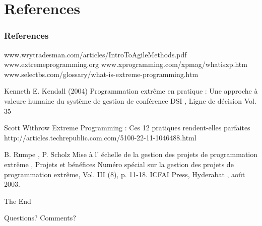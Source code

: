 \documentclass[	11pt, ]{beamer}
\begin{document}
\section{References}
\begin{frame} %
	\frametitle{References}
	
	\begin{thebibliography}{99} %
		\footnotesize %
		
		 www.wrytradesman.com/articles/IntroToAgileMethods.pdf
		www.extremeprogramming.org
		www.xprogramming.com/xpmag/whatisxp.htm
		www.selectbs.com/glossary/what-is-extreme-programming.htm
		
		
			 Kenneth E. Kendall (2004)
			\newblock Programmation extrême en pratique : Une approche à valeure humaine du système de gestion
de conférence DSI , Ligne de décision Vol. 35

			Scott Withrow
			\newblock Extreme Programming : Ces 12 pratiques rendent-elles parfaites
http://articles.techrepublic.com.com/5100-22-11-1046488.html

			 B. Rumpe , P. Scholz
			\newblock Mise à l' échelle de la gestion des projets de programmation extrême , Projets et bénéfices
Numéro spécial sur la gestion des projets de programmation extrême, Vol. III (8), p. 11-18. ICFAI Press, Hyderabat ,
août 2003.
	\end{thebibliography}
\end{frame}

\begin{frame}[plain] %
	\begin{center}
		{\Huge The End}
		
		\bigskip\bigskip %
		
		{\LARGE Questions? Comments?}
	\end{center}
\end{frame}

\end{document}
